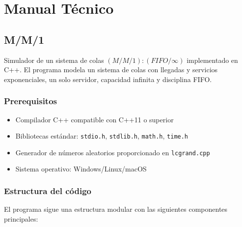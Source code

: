 \documentclass{article}
\begin{document}

\section{Manual Técnico}

\subsection{M/M/1}\label{subsec:mm1}

Simulador de un sistema de colas $(M/M/1):(FIFO/\infty)$ implementado en C++. El programa modela un sistema de colas con llegadas y servicios exponenciales, un solo servidor, capacidad infinita y disciplina FIFO.

\subsubsection{Prerequisitos}

\begin{itemize}
    \item Compilador C++ compatible con C++11 o superior
    \item Bibliotecas estándar: \texttt{stdio.h}, \texttt{stdlib.h}, \texttt{math.h}, \texttt{time.h}
    \item Generador de números aleatorios proporcionado en \texttt{lcgrand.cpp}
    \item Sistema operativo: Windows/Linux/macOS
\end{itemize}

\subsubsection{Estructura del código}

El programa sigue una estructura modular con las siguientes componentes principales:
\end{document}
